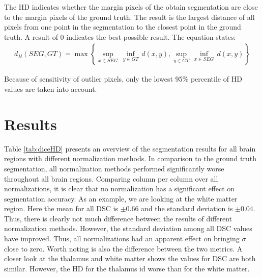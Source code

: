 \documentclass[article]{IEEEtran}
\begin{document}
	The HD indicates whether the margin pixels of the obtain segmentation are close to the margin pixels of the ground truth. 
	The result is the largest distance of all pixels from one point in the segmentation to the closest point in the ground truth.
	A result of 0 indicates the best possible result.
	The equation states:
	\begin{eqnarray*}
			d_H (SEG, GT) = \max \left\{ \underset{x\in SEG}{\mathop{\sup }}\,\underset{y\in GT}{\mathop{\inf }}\,d(x,y),\underset{y\in GT}{\mathop{\sup }}\,\underset{x\in SEG}{\mathop{\inf }}\,d(x,y) \right\}
	\end{eqnarray*}
	
	Because of sensitivity of outlier pixels, only the lowest 95\% percentile of HD values are taken into account.

	


\section{Results}

	Table \ref{tab:diceHD} presents an overview of the segmentation results for all brain regions with different normalization methods. 
	In comparison to the ground truth segmentation, all normalization methods performed significantly worse throughout all brain regions.
	Comparing column per column over all normalizations, it is clear that no normalization has a significant effect on segmentation accuracy.
	As an example, we are looking at the white matter region. 
	Here the mean for all DSC is $\pm$0.66 and the standard deviation is $\pm$0.04. 
	Thus, there is clearly not much difference between the results of different normalization methods.
	However, the standard deviation among all DSC values have improved.
	Thus, all normalizations had an apparent effect on bringing $\sigma$ close to zero.
	Worth noting is also the difference between the two metrics. A closer look at the thalamus and white matter shows the values for DSC are both similar.
	However, the HD for the thalamus id worse than for the white matter.\smallskip
	
\end{document}
